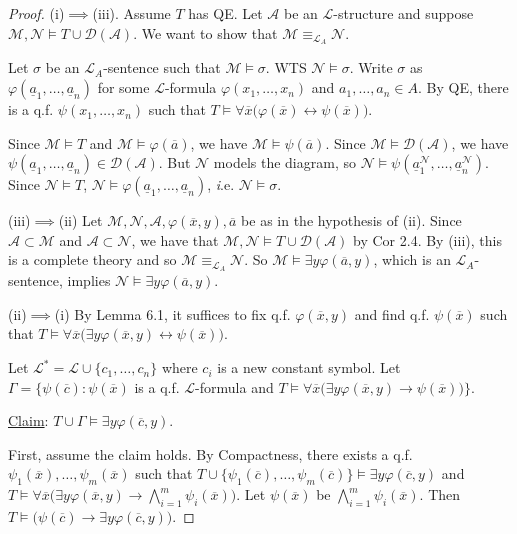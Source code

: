 \documentclass[]{article}
\theoremstyle{custhm}
\theoremstyle{cusdef}
\theoremstyle{custhm}
\theoremstyle{custhm}
\theoremstyle{custhm}
\theoremstyle{ex}
\theoremstyle{custhm}
\theoremstyle{cusdef}
\theoremstyle{remark}
\renewcommand{\L}{\mathcal{L}}
\renewcommand{\it}[1]{\textit{#1}}
\newcommand{\M}{\mathcal{M}}
\renewcommand{\phi}{\varphi}
\renewcommand{\bar}{\overline}
\newcommand{\N}{\mathcal{N}}
\newcommand{\A}{\mathcal{A}}
\newcommand{\D}{\mathcal{D}}
\begin{document}
\begin{proof}
(i)$\implies$(iii). Assume $T$ has QE. Let $\A$ be an $\L$-structure and suppose $\M,\N\models T\cup \D(\A)$. We want to show that $\M \equiv_{\L_A} \N$.

Let $\sigma$ be an $\L_A$-sentence such that $\M\models \sigma$. WTS $\N\models \sigma$. Write $\sigma$ as $\phi(\underline{a}_1,\dots,\underline{a}_n)$ for some $\L$-formula $\phi(x_1,\dots,x_n)$ and $a_1,\dots,a_n\in A$. By QE, there is a q.f. $\psi(x_1,\dots,x_n)$ such that $T\models \forall \bar{x}\big(\phi(\bar{x})\leftrightarrow \psi(\bar{x})\big)$.

Since $\M\models T$ and $\M\models \phi(\bar{a})$, we have $\M\models \psi(\bar{a})$. Since $\M\models\D(\A)$, we have $\psi(\underline{a}_1,\dots,\underline{a}_n)\in\D(\A)$. But $\N$ models the diagram, so $\N\models\psi(\underline{a}_1^\N,\dots,\underline{a}_n^\N)$. Since $\N\models T$, $\N\models \phi(\underline{a}_1,\dots,\underline{a}_n)$, {\it i.e.} $\N\models \sigma$.

(iii)$\implies$(ii) Let $\M,\N,\A,\phi(\bar{x},y),\bar{a}$ be as in the hypothesis of (ii). Since $\A\subset \M$ and $\A\subset \N$, we have that $\M,\N\models T\cup \D(\A)$ by Cor 2.4. By (iii), this is a complete theory and so $\M\equiv_{\L_A}\N$. So $\M\models \exists y\phi(\bar{a},y)$, which is an $\L_A$-sentence, implies $\N\models \exists y \phi(\bar{a},y)$.

(ii)$\implies$(i) By Lemma 6.1, it suffices to fix q.f. $\phi(\bar{x},y)$ and find q.f. $\psi(\bar{x})$ such that $T\models \forall \bar{x}\big(\exists y \phi(\bar{x},y)\leftrightarrow\psi(\bar{x})\big)$.

Let $\L^\ast = \L \cup \{c_1,\dots,c_n\}$ where $c_i$ is a new constant symbol. Let $\Gamma = \{\psi(\bar{c}): \psi(\bar{x})$ is a q.f. $\L$-formula and $T\models \forall\bar{x} \big(\exists y\phi(\bar{x},y)\rightarrow \psi(\bar{x})\big)\}$.

\underline{Claim}: $T\cup \Gamma \models \exists y\phi(\bar{c},y)$.

First, assume the claim holds. By Compactness, there exists a q.f. $\psi_1(\bar{x}),\dots,\psi_m(\bar{x})$ such that $T\cup\{\psi_1(\bar{c}),\dots,\psi_m(\bar{c})\}\models \exists y\phi(\bar{c},y)$ and $T\models \forall \bar{x}\big(\exists y\phi(\bar{x},y)\rightarrow \bigwedge_{i=1}^{m}\psi_i(\bar{x})\big)$. Let $\psi(\bar{x})$ be $\bigwedge_{i=1}^{m}\psi_i(\bar{x})$. Then $T\models \big(\psi(\bar{c}) \rightarrow \exists y\phi(\bar{c},y)\big)$.


\end{proof}
\end{document}

